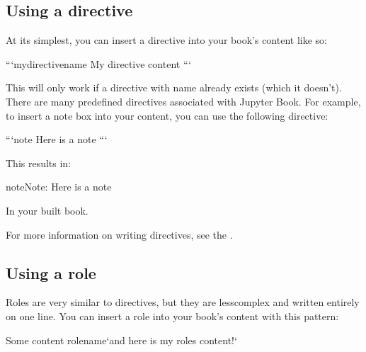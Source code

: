 \documentclass[letterpaper,10pt,english]{jupyterBook}
\begin{document}
\subsection{Using a directive}
\label{\detokenize{markdown:using-a-directive}}
\sphinxAtStartPar
At its simplest, you can insert a directive into your book’s content like so:

\begin{sphinxVerbatim}[commandchars=\\\{\}]
```\PYGZob{}mydirectivename\PYGZcb{}
My directive content
```
\end{sphinxVerbatim}

\sphinxAtStartPar
This will only work if a directive with name  already exists
(which it doesn’t). There are many pre\sphinxhyphen{}defined directives associated with
Jupyter Book. For example, to insert a note box into your content, you can
use the following directive:

\begin{sphinxVerbatim}[commandchars=\\\{\}]
```\PYGZob{}note\PYGZcb{}
Here is a note
```
\end{sphinxVerbatim}

\sphinxAtStartPar
This results in:

\begin{sphinxadmonition}{note}{Note:}
\sphinxAtStartPar
Here is a note
\end{sphinxadmonition}

\sphinxAtStartPar
In your built book.

\sphinxAtStartPar
For more information on writing directives, see the
.


\subsection{Using a role}
\label{\detokenize{markdown:using-a-role}}
\sphinxAtStartPar
Roles are very similar to directives, but they are less\sphinxhyphen{}complex and written
entirely on one line. You can insert a role into your book’s content with
this pattern:

\begin{sphinxVerbatim}[commandchars=\\\{\}]
Some content \PYGZob{}rolename\PYGZcb{}`and here is my role\PYGZsq{}s content!`
\end{sphinxVerbatim}
\end{document}
